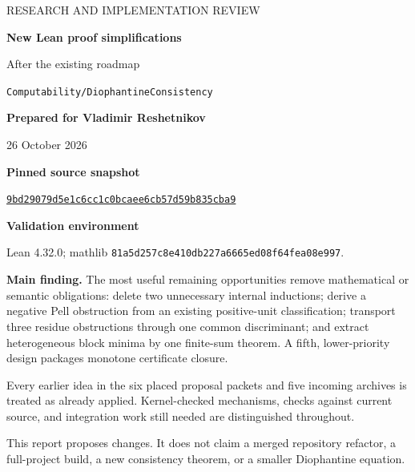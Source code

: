 \documentclass[11pt,letterpaper]{article}
\newcommand{\code}[1]{\nolinkurl{#1}}
\begin{document}
\begin{titlepage}
\vspace*{0.65in}
{\color{blue!45!black}\Large RESEARCH AND IMPLEMENTATION REVIEW\par}
\vspace{0.4in}
{\Huge\bfseries New Lean proof simplifications\par}
\vspace{0.15in}
{\LARGE After the existing roadmap\par}
\vspace{0.35in}
{\large \code{Computability/DiophantineConsistency}\par}
\vspace{0.35in}
\textbf{Prepared for Vladimir Reshetnikov}\par
26 October 2026\par
\vspace{0.5in}
\textbf{Pinned source snapshot}\par
\href{https://github.com/VladimirReshetnikov/ProveIt/commit/9bd29079d5e1c6cc1c0bcaee6cb57d59b835cba9}{\texttt{9bd29079d5e1c6cc1c0bcaee6cb57d59b835cba9}}\par
\textbf{Validation environment}\par
Lean 4.32.0; mathlib \texttt{81a5d257c8e410db227a6665ed08f64fea08e997}.\par
\vspace{0.45in}
\begin{minipage}{0.94\textwidth}
\textbf{Main finding.} The most useful remaining opportunities remove mathematical or semantic obligations: delete two unnecessary internal inductions; derive a negative Pell obstruction from an existing positive-unit classification; transport three residue obstructions through one common discriminant; and extract heterogeneous block minima by one finite-sum theorem. A fifth, lower-priority design packages monotone certificate closure.\par
\medskip
Every earlier idea in the six placed proposal packets and five incoming archives is treated as already applied. Kernel-checked mechanisms, checks against current source, and integration work still needed are distinguished throughout.
\end{minipage}
\vfill
\small This report proposes changes. It does not claim a merged repository refactor, a full-project build, a new consistency theorem, or a smaller Diophantine equation.
\end{titlepage}

\tableofcontents
\newpage
\end{document}
